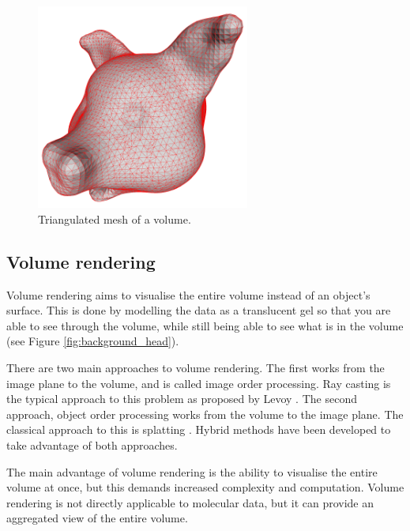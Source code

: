 \begin{figure}[h!]
  \begin{center}
    \includegraphics[width=70mm]{triangulated_mesh}
  \end{center}
  \caption{Triangulated mesh of a volume.}
  \label{fig:background_mesh}
\end{figure}


\subsection{Volume rendering}
\label{sub:background_volume}

Volume rendering aims to visualise the entire volume instead of an object's
surface. This is done by modelling the data as a translucent gel so that you
are able to see through the volume, while still being able to see what is in
the volume (see Figure \ref{fig:background_head}).

There are two main approaches to volume rendering. The first works from the
image plane to the volume, and is called image order processing. Ray casting is
the typical approach to this problem as proposed by Levoy \citep{levoy88}. The
second approach, object order processing works from the volume to the image
plane. The classical approach to this is splatting \citep{westover89}.  Hybrid
methods have been developed to take advantage of both approaches.

The main advantage of volume rendering is the ability to visualise the entire
volume at once, but this demands increased complexity and computation. Volume
rendering is not directly applicable to molecular data, but it can provide an
aggregated view of the entire volume.


